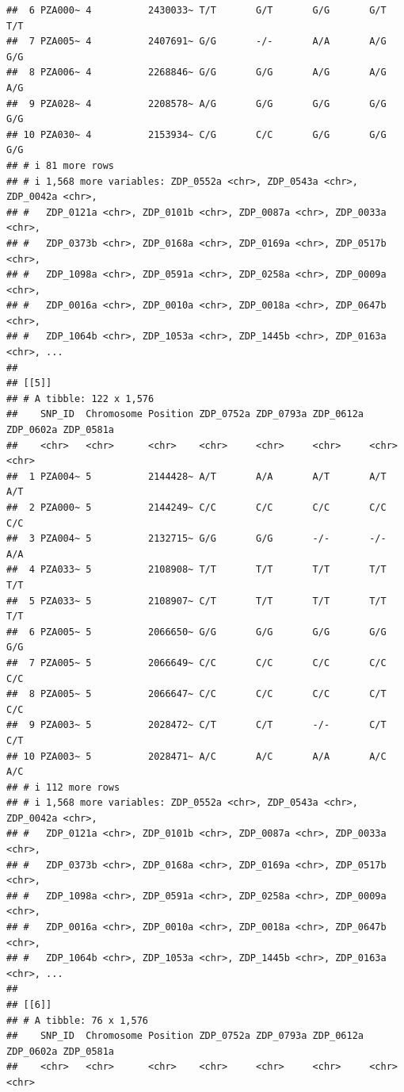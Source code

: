 \documentclass[
]{article}
\begin{document}
\begin{verbatim}
##  6 PZA000~ 4          2430033~ T/T       G/T       G/G       G/T       T/T      
##  7 PZA005~ 4          2407691~ G/G       -/-       A/A       A/G       G/G      
##  8 PZA006~ 4          2268846~ G/G       G/G       A/G       A/G       A/G      
##  9 PZA028~ 4          2208578~ A/G       G/G       G/G       G/G       G/G      
## 10 PZA030~ 4          2153934~ C/G       C/C       G/G       G/G       G/G      
## # i 81 more rows
## # i 1,568 more variables: ZDP_0552a <chr>, ZDP_0543a <chr>, ZDP_0042a <chr>,
## #   ZDP_0121a <chr>, ZDP_0101b <chr>, ZDP_0087a <chr>, ZDP_0033a <chr>,
## #   ZDP_0373b <chr>, ZDP_0168a <chr>, ZDP_0169a <chr>, ZDP_0517b <chr>,
## #   ZDP_1098a <chr>, ZDP_0591a <chr>, ZDP_0258a <chr>, ZDP_0009a <chr>,
## #   ZDP_0016a <chr>, ZDP_0010a <chr>, ZDP_0018a <chr>, ZDP_0647b <chr>,
## #   ZDP_1064b <chr>, ZDP_1053a <chr>, ZDP_1445b <chr>, ZDP_0163a <chr>, ...
## 
## [[5]]
## # A tibble: 122 x 1,576
##    SNP_ID  Chromosome Position ZDP_0752a ZDP_0793a ZDP_0612a ZDP_0602a ZDP_0581a
##    <chr>   <chr>      <chr>    <chr>     <chr>     <chr>     <chr>     <chr>    
##  1 PZA004~ 5          2144428~ A/T       A/A       A/T       A/T       A/T      
##  2 PZA000~ 5          2144249~ C/C       C/C       C/C       C/C       C/C      
##  3 PZA004~ 5          2132715~ G/G       G/G       -/-       -/-       A/A      
##  4 PZA033~ 5          2108908~ T/T       T/T       T/T       T/T       T/T      
##  5 PZA033~ 5          2108907~ C/T       T/T       T/T       T/T       T/T      
##  6 PZA005~ 5          2066650~ G/G       G/G       G/G       G/G       G/G      
##  7 PZA005~ 5          2066649~ C/C       C/C       C/C       C/C       C/C      
##  8 PZA005~ 5          2066647~ C/C       C/C       C/C       C/T       C/C      
##  9 PZA003~ 5          2028472~ C/T       C/T       -/-       C/T       C/T      
## 10 PZA003~ 5          2028471~ A/C       A/C       A/A       A/C       A/C      
## # i 112 more rows
## # i 1,568 more variables: ZDP_0552a <chr>, ZDP_0543a <chr>, ZDP_0042a <chr>,
## #   ZDP_0121a <chr>, ZDP_0101b <chr>, ZDP_0087a <chr>, ZDP_0033a <chr>,
## #   ZDP_0373b <chr>, ZDP_0168a <chr>, ZDP_0169a <chr>, ZDP_0517b <chr>,
## #   ZDP_1098a <chr>, ZDP_0591a <chr>, ZDP_0258a <chr>, ZDP_0009a <chr>,
## #   ZDP_0016a <chr>, ZDP_0010a <chr>, ZDP_0018a <chr>, ZDP_0647b <chr>,
## #   ZDP_1064b <chr>, ZDP_1053a <chr>, ZDP_1445b <chr>, ZDP_0163a <chr>, ...
## 
## [[6]]
## # A tibble: 76 x 1,576
##    SNP_ID  Chromosome Position ZDP_0752a ZDP_0793a ZDP_0612a ZDP_0602a ZDP_0581a
##    <chr>   <chr>      <chr>    <chr>     <chr>     <chr>     <chr>     <chr>    

\end{verbatim}
\end{document}
